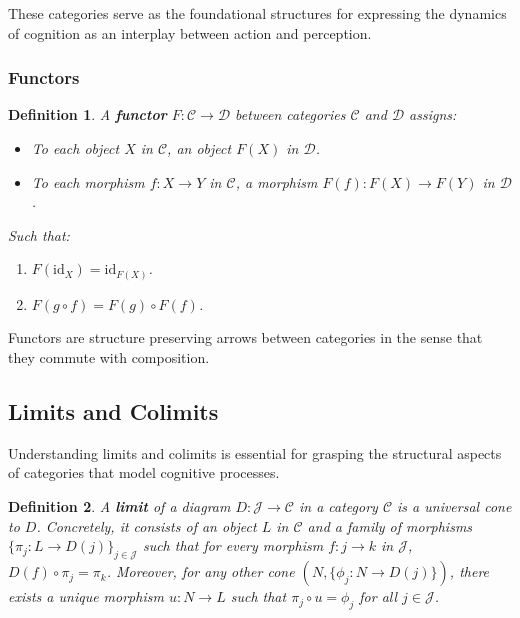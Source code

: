 \documentclass{article}
\newtheorem{definition}{Definition}[section]
\begin{document}
These categories serve as the foundational structures for expressing the dynamics of cognition as an interplay between action and perception.

\subsubsection{Functors}

\begin{definition} A \textbf{functor} $F \colon \mathcal{C} \to \mathcal{D}$ between categories $\mathcal{C}$ and $\mathcal{D}$ assigns:

    \begin{itemize} \item To each object $X$ in $\mathcal{C}$, an object $F(X)$ in $\mathcal{D}$. \item To each morphism $f \colon X \to Y$ in $\mathcal{C}$, a morphism $F(f) \colon F(X) \to F(Y)$ in $\mathcal{D}$. \end{itemize}

    Such that:

    \begin{enumerate} \item $F(\text{id}_X) = \text{id}_{F(X)}$. \item $F(g \circ f) = F(g) \circ F(f)$. \end{enumerate} \end{definition}

Functors are structure preserving arrows between categories in the sense that they commute with composition.

\subsection{Limits and Colimits}

Understanding limits and colimits is essential for grasping the structural aspects of categories that model cognitive processes.

\begin{definition}
    A \textbf{limit} of a diagram $D \colon \mathcal{J} \to \mathcal{C}$ in a category $\mathcal{C}$ is a universal cone to $D$. Concretely, it consists of an object $L$ in $\mathcal{C}$ and a family of morphisms $\{\pi_j \colon L \to D(j)\}_{j \in \mathcal{J}}$ such that for every morphism $f \colon j \to k$ in $\mathcal{J}$, $D(f) \circ \pi_j = \pi_k$. Moreover, for any other cone $(N, \{\phi_j \colon N \to D(j)\})$, there exists a unique morphism $u \colon N \to L$ such that $\pi_j \circ u = \phi_j$ for all $j \in \mathcal{J}$.
\end{definition}
\end{document}
